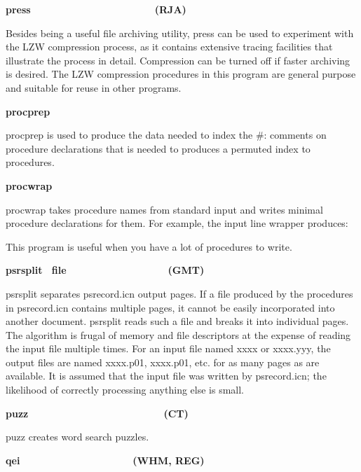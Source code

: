 {{\sffamily\bfseries
press\ \ \ \ \ \ \ \ \ \ \ \ \ \ \ \ \ \ \ \ \ \ (RJA)}

Besides being a useful file archiving utility, \textsf{press} can be
used to experiment with the LZW compression process, as it contains
extensive tracing facilities that illustrate the process
in detail. Compression can be turned off if faster archiving is
desired. The LZW compression procedures in this program are general
purpose and suitable for reuse in other programs.

{\sffamily\bfseries
procprep\ \ \ \ \ \ \ \ \ \ \ \ \ \ \ \ \ \ \ \ }

\textsf{procprep} is used to produce the data needed to index the
{\textquotedbl}\#:{\textquotedbl} comments on procedure declarations
that is needed to produces a permuted index to procedures. 

{\sffamily\bfseries
procwrap\ \ \ \ \ \ \ \ \ \ \ \ \ \ \ \ \ \ \ \ }

\textsf{procwrap} takes procedure names from standard input and writes
minimal procedure declarations for them. For example, the input line
wrapper produces:



This program is useful when you have a lot of procedures to write. 

{\sffamily\bfseries
psrsplit
\ \textrm{\textmd{file\ \ \ \ \ \ \ \ \ \ \ \ \ \ \ \ \ \ }}(GMT)}

\textsf{psrsplit} separates \textsf{psrecord.icn}
output pages. If a file produced by the procedures in
\textsf{psrecord.icn} contains multiple pages, it cannot be easily
incorporated into another document. \textsf{psrsplit} reads such a file
and breaks it into individual pages. The algorithm is frugal of memory
and file descriptors at the expense of reading the input file multiple
times. For an input file named \textsf{xxxx} or \textsf{xxxx.yyy}, the
output files are named \textsf{xxxx.p01}, \textsf{xxxx.p01}, etc. for
as many pages as are available. It is assumed that the input file was
written by \textsf{psrecord.icn}; the likelihood of correctly
processing anything else is small. 

{\sffamily\bfseries
puzz\ \ \ \ \ \ \ \ \ \ \ \ \ \ \ \ \ \ \ \ \ \  \ \ (CT)}

\textsf{puzz} creates word search puzzles. 

{\sffamily\bfseries
qei\ \ \ \ \ \ \ \ \ \ \ \ \ \ \ \ \ \ \ \ (WHM, REG)}

}
